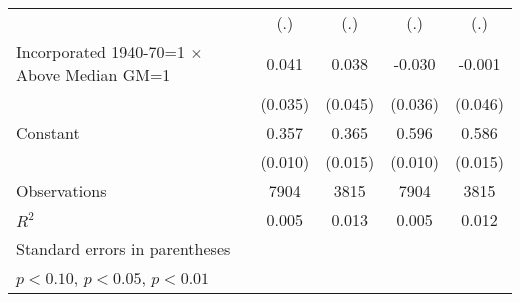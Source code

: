 \begin{table}[htbp]
\begin{tabular}{l*{4}{c}}
                    &         (.)         &         (.)         &         (.)         &         (.)         \\
[1em]
Incorporated 1940-70=1 $\times$ Above Median GM=1&       0.041         &       0.038         &      -0.030         &      -0.001         \\
                    &     (0.035)         &     (0.045)         &     (0.036)         &     (0.046)         \\
[1em]
Constant            &       0.357\sym{***}&       0.365\sym{***}&       0.596\sym{***}&       0.586\sym{***}\\
                    &     (0.010)         &     (0.015)         &     (0.010)         &     (0.015)         \\
\hline
Observations        &        7904         &        3815         &        7904         &        3815         \\
\(R^{2}\)           &       0.005         &       0.013         &       0.005         &       0.012         \\
\hline\hline
\multicolumn{5}{l}{\footnotesize Standard errors in parentheses}\\
\multicolumn{5}{l}{\footnotesize \sym{*} \(p<0.10\), \sym{**} \(p<0.05\), \sym{***} \(p<0.01\)}\\
\end{tabular}
\end{table}
